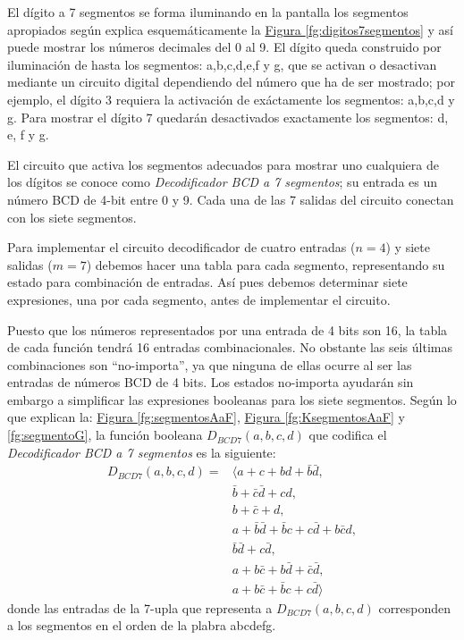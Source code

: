 \begin{exercise}
  \label{ex:digitos7segmentos}
  El dígito a 7 segmentos se forma iluminando en la pantalla los
  segmentos apropiados según explica esquemáticamente la
  \hyperref[fg:digitos7segmentos]{Figura \ref*{fg:digitos7segmentos}}
  y así puede mostrar los números decimales del 0 al 9. El dígito
  queda construido por iluminación de hasta los segmentos: a,b,c,d,e,f
  y g, que se activan o desactivan mediante un circuito digital
  dependiendo del número que ha de ser mostrado; por ejemplo, el
  dígito 3 requiera la activación de exáctamente los segmentos:
  a,b,c,d y g. Para mostrar el dígito 7 quedarán desactivados
  exactamente los segmentos: d, e, f y g.

  El circuito que activa los segmentos adecuados para mostrar uno
  cualquiera de los dígitos se conoce como \textit{Decodificador BCD a
    7 segmentos}; su entrada es un número BCD de 4-bit entre 0 y
  9. Cada una de las 7 salidas del circuito conectan con los siete
  segmentos.

  Para implementar el circuito decodificador de cuatro entradas
  ($n=4$) y siete salidas ($m=7$) debemos hacer una tabla para cada
  segmento, representando su estado para combinación de entradas. Así
  pues debemos determinar siete expresiones, una por cada segmento,
  antes de implementar el circuito.

  Puesto que los números representados por una entrada de 4 bits son
  16, la tabla de cada función tendrá 16 entradas combinacionales. No
  obstante las seis últimas combinaciones son ``no-importa'', ya que
  ninguna de ellas ocurre al ser las entradas de números BCD de 4
  bits. Los estados no-importa ayudarán sin embargo a simplificar las
  expresiones booleanas para los siete segmentos. Según lo que
  explican la: \hyperref[fg:segmentosAaF]{Figura
    \ref*{fg:segmentosAaF}}, \hyperref[fg:KsegmentosAaF]{Figura
    \ref*{fg:KsegmentosAaF}} y
  \hyperref[fg:segmentoG]{\ref*{fg:segmentoG}}, la función booleana
  $D_{BCD7}(a,b,c,d)$ que codifica el \textit{Decodificador BCD a
    7 segmentos} es la siguiente:
  \begin{align*}
    D_{BCD7}(a,b,c,d)=&\langle a+c+bd+\bar{b}\bar{d},\\
                    &\bar{b}+\bar{c}\bar{d}+cd,\\
                    &b+\bar{c}+d,\\
                    &a+\bar{b}\bar{d}+\bar{b}c+c\bar{d}+b\bar{c}d,\\
                    &\bar{b}\bar{d}+c\bar{d},\\
                    &a+b\bar{c}+b\bar{d}+\bar{c}\bar{d},\\
                    &a+b\bar{c}+\bar{b}c+c\bar{d}\rangle
  \end{align*}
  donde las entradas de la 7-upla que representa a $D_{BCD7}(a,b,c,d)$
  corresponden a los segmentos en el orden de la plabra abcdefg.
\end{exercise}

